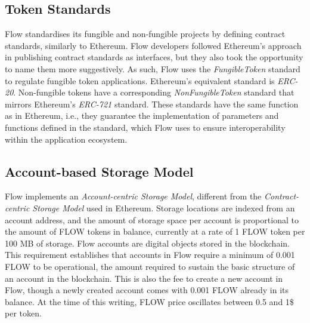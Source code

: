 \documentclass[../NFTComp_IEEE.tex]{subfiles}
\begin{document}
\subsection{Token Standards}
Flow standardises its fungible and non-fungible projects by defining contract standards, similarly to Ethereum. Flow developers followed Ethereum's approach in publishing contract standards as interfaces, but they also took the opportunity to name them more suggestively. As such, Flow uses the \textit{FungibleToken} standard \cite{Dapper2022c} to regulate fungible token applications. Ethereum's equivalent standard is \textit{ERC-20}. Non-fungible tokens have a corresponding \textit{NonFungibleToken} standard \cite{Dapper2022d} that mirrors Ethereum's \textit{ERC-721} standard. These standards have the same function as in Ethereum, i.e., they guarantee the implementation of parameters and functions defined in the standard, which Flow uses to ensure interoperability within the application ecosystem.

\subsection{Account-based Storage Model}
Flow implements an \textit{Account-centric Storage Model}, different from the \textit{Contract-centric Storage Model} used in Ethereum. Storage locations are indexed from an account address, and the amount of storage space per account is proportional to the amount of FLOW tokens in balance, currently at a rate of 1 FLOW token per 100 MB of storage. Flow accounts are digital objects stored in the blockchain. This requirement establishes that accounts in Flow require a minimum of 0.001 FLOW to be operational, the amount required to sustain the basic structure of an account in the blockchain. This is also the fee to create a new account in Flow, though a newly created account comes with 0.001 FLOW already in its balance. At the time of this writing, FLOW price oscillates between 0.5 and 1\$ per token.
\end{document}

